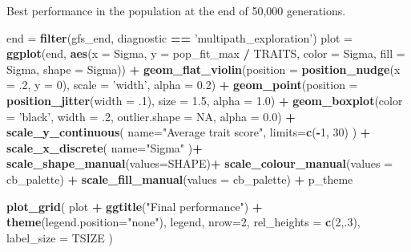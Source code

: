\documentclass[]{book}
\newenvironment{Shaded}{\begin{snugshade}}{\end{snugshade}}
\newcommand{\DataTypeTok}[1]{\textcolor[rgb]{0.13,0.29,0.53}{#1}}
\newcommand{\DecValTok}[1]{\textcolor[rgb]{0.00,0.00,0.81}{#1}}
\newcommand{\FloatTok}[1]{\textcolor[rgb]{0.00,0.00,0.81}{#1}}
\newcommand{\KeywordTok}[1]{\textcolor[rgb]{0.13,0.29,0.53}{\textbf{#1}}}
\newcommand{\NormalTok}[1]{#1}
\newcommand{\OperatorTok}[1]{\textcolor[rgb]{0.81,0.36,0.00}{\textbf{#1}}}
\newcommand{\OtherTok}[1]{\textcolor[rgb]{0.56,0.35,0.01}{#1}}
\newcommand{\StringTok}[1]{\textcolor[rgb]{0.31,0.60,0.02}{#1}}
\begin{document}
Best performance in the population at the end of 50,000 generations.

\begin{Shaded}
\begin{Highlighting}[]
\NormalTok{end =}\StringTok{ }\KeywordTok{filter}\NormalTok{(gfs_end, diagnostic }\OperatorTok{==}\StringTok{ 'multipath_exploration'}\NormalTok{)}
\NormalTok{plot =}\StringTok{ }\KeywordTok{ggplot}\NormalTok{(end, }\KeywordTok{aes}\NormalTok{(}\DataTypeTok{x =}\NormalTok{ Sigma, }\DataTypeTok{y =}\NormalTok{ pop_fit_max }\OperatorTok{/}\StringTok{ }\NormalTok{TRAITS, }\DataTypeTok{color =}\NormalTok{ Sigma, }\DataTypeTok{fill =}\NormalTok{ Sigma, }\DataTypeTok{shape =}\NormalTok{ Sigma)) }\OperatorTok{+}
\StringTok{  }\KeywordTok{geom_flat_violin}\NormalTok{(}\DataTypeTok{position =} \KeywordTok{position_nudge}\NormalTok{(}\DataTypeTok{x =} \FloatTok{.2}\NormalTok{, }\DataTypeTok{y =} \DecValTok{0}\NormalTok{), }\DataTypeTok{scale =} \StringTok{'width'}\NormalTok{, }\DataTypeTok{alpha =} \FloatTok{0.2}\NormalTok{) }\OperatorTok{+}
\StringTok{  }\KeywordTok{geom_point}\NormalTok{(}\DataTypeTok{position =} \KeywordTok{position_jitter}\NormalTok{(}\DataTypeTok{width =} \FloatTok{.1}\NormalTok{), }\DataTypeTok{size =} \FloatTok{1.5}\NormalTok{, }\DataTypeTok{alpha =} \FloatTok{1.0}\NormalTok{) }\OperatorTok{+}
\StringTok{  }\KeywordTok{geom_boxplot}\NormalTok{(}\DataTypeTok{color =} \StringTok{'black'}\NormalTok{, }\DataTypeTok{width =} \FloatTok{.2}\NormalTok{, }\DataTypeTok{outlier.shape =} \OtherTok{NA}\NormalTok{, }\DataTypeTok{alpha =} \FloatTok{0.0}\NormalTok{) }\OperatorTok{+}
\StringTok{  }\KeywordTok{scale_y_continuous}\NormalTok{(}
    \DataTypeTok{name=}\StringTok{"Average trait score"}\NormalTok{,}
    \DataTypeTok{limits=}\KeywordTok{c}\NormalTok{(}\OperatorTok{-}\DecValTok{1}\NormalTok{, }\DecValTok{30}\NormalTok{)}
\NormalTok{  ) }\OperatorTok{+}
\StringTok{  }\KeywordTok{scale_x_discrete}\NormalTok{(}
    \DataTypeTok{name=}\StringTok{"Sigma"}
\NormalTok{  )}\OperatorTok{+}
\StringTok{  }\KeywordTok{scale_shape_manual}\NormalTok{(}\DataTypeTok{values=}\NormalTok{SHAPE)}\OperatorTok{+}
\StringTok{  }\KeywordTok{scale_colour_manual}\NormalTok{(}\DataTypeTok{values =}\NormalTok{ cb_palette) }\OperatorTok{+}
\StringTok{  }\KeywordTok{scale_fill_manual}\NormalTok{(}\DataTypeTok{values =}\NormalTok{ cb_palette) }\OperatorTok{+}
\StringTok{  }\NormalTok{p_theme}

\KeywordTok{plot_grid}\NormalTok{(}
\NormalTok{  plot }\OperatorTok{+}
\StringTok{    }\KeywordTok{ggtitle}\NormalTok{(}\StringTok{"Final performance"}\NormalTok{) }\OperatorTok{+}
\StringTok{    }\KeywordTok{theme}\NormalTok{(}\DataTypeTok{legend.position=}\StringTok{"none"}\NormalTok{),}
\NormalTok{  legend,}
  \DataTypeTok{nrow=}\DecValTok{2}\NormalTok{,}
  \DataTypeTok{rel_heights =} \KeywordTok{c}\NormalTok{(}\DecValTok{2}\NormalTok{,.}\DecValTok{3}\NormalTok{),}
  \DataTypeTok{label_size =}\NormalTok{ TSIZE}
\NormalTok{)}
\end{Highlighting}
\end{Shaded}
\end{document}
